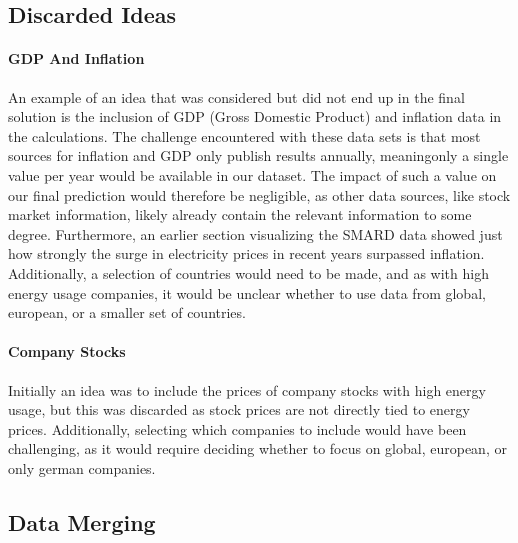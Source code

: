 \documentclass[a4paper]{article}
\begin{document}
    \subsection{Discarded Ideas}\label{discarded-ideas}

\paragraph{GDP And Inflation}\label{gdp-and-inflation}

An example of an idea that was considered but did not end up in the
final solution is the inclusion of GDP (Gross Domestic Product) and
inflation data in the calculations. The challenge encountered with these
data sets is that most sources for inflation and GDP only publish
results annually, meaningonly a single value per year would be available
in our dataset. The impact of such a value on our final prediction would
therefore be negligible, as other data sources, like stock market
information, likely already contain the relevant information to some
degree. Furthermore, an earlier section visualizing the SMARD data
showed just how strongly the surge in electricity prices in recent years
surpassed inflation. Additionally, a selection of countries would need
to be made, and as with high energy usage companies, it would be unclear
whether to use data from global, european, or a smaller set of
countries.

\paragraph{Company Stocks}\label{company-stocks}

Initially an idea was to include the prices of company stocks with high
energy usage, but this was discarded as stock prices are not directly
tied to energy prices. Additionally, selecting which companies to
include would have been challenging, as it would require deciding
whether to focus on global, european, or only german companies.

    \subsection{Data Merging}\label{data-merging}
\end{document}
